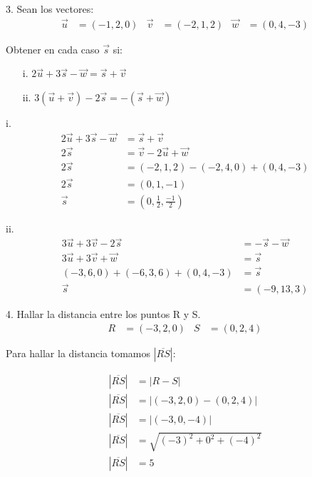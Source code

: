 \documentclass{article}
\begin{document}
3. Sean los vectores:
\begin{align*}
    \vec{u} & = (-1,2,0) & \vec{v} & = (-2, 1, 2) & \vec{w} & = (0, 4, -3)
\end{align*}

Obtener en cada caso $\vec{s}$ si:

\begin{itemize}
    \item[i.]  $2\vec{u} + 3 \vec{s} - \vec{w} = \vec{s} + \vec{v}$
    \item[ii.] $3(\vec{u}+\vec{v}) - 2 \vec{s} = -(\vec{s} + \vec{w})$
\end{itemize}

i.
\begin{align*}
    2\vec{u} + 3\vec{s} - \vec{w} & = \vec{s} + \vec{v}                                 \\
    2\vec{s}                      & = \vec{v} - 2\vec{u} + \vec{w}                      \\
    2\vec{s}                      & = (-2, 1, 2) - (-2, 4, 0) + (0, 4, -3)              \\
    2\vec{s}                      & = (0, 1, -1)                                        \\
    \vec{s}                       & = \boxed{\left(0, \frac{1}{2}, \frac{-1}{2}\right)}
\end{align*}

ii.
\begin{align*}
    3\vec{u} + 3\vec{v} - 2\vec{s}       & = -\vec{s} - \vec{w}  \\
    3\vec{u} + 3\vec{v} + \vec{w}        & = \vec{s}             \\
    (-3, 6, 0) + (-6, 3, 6) + (0, 4, -3) & = \vec{s}             \\
    \vec{s}                              & = \boxed{(-9, 13, 3)}
\end{align*}

4. Hallar la distancia entre los puntos R y S.
\begin{align*}
    R & = (-3,2,0) & S & = (0, 2, 4)
\end{align*}

Para hallar la distancia tomamos $|\overline{RS}|$:

\begin{align*}
    |\overline{RS}| & = |R - S|                      \\
    |\overline{RS}| & = |(-3,2,0) - (0,2,4)|         \\
    |\overline{RS}| & = |(-3,0,-4)|                  \\
    |\overline{RS}| & = \sqrt{(-3)^2 + 0^2 + (-4)^2} \\
    |\overline{RS}| & = \boxed{5}
\end{align*}
\end{document}
